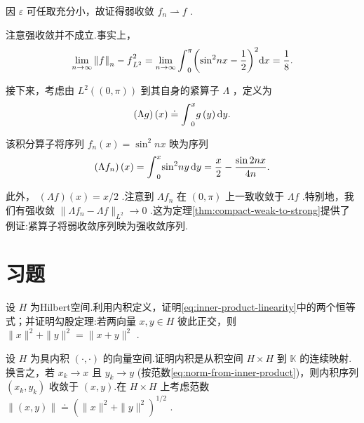 \begin{instance}
因 $\varepsilon$ 可任取充分小，故证得弱收敛 ${f}_{n} \rightharpoonup  f$ .

注意强收敛并不成立.事实上，
\[
\mathop{\lim }\limits_{{n \rightarrow  \infty }}{\norm{f}_{n} - f}_{{L}^{2}}^{2} = \mathop{\lim }\limits_{{n \rightarrow  \infty }}{\int }_{0}^{\pi }{\left( {\sin }^{2}nx - \frac{1}{2}\right) }^{2}{\mathop{}\!\mathrm{d} x} = \frac{1}{8}.
\]

接下来，考虑由 ${L}^{2}\left( \left(  {0,\pi }\right)  \right)$ 到其自身的紧算子 $\Lambda$ ，定义为
\[
\left( {\Lambda g}\right) \left( x\right)  \doteq  {\int }_{0}^{x}g\left( y\right) {\mathop{}\!\mathrm{d} y}.
\]

该积分算子将序列 ${f}_{n}\left( x\right)  = {\sin }^{2}{nx}$ 映为序列
\[
\left( {\Lambda {f}_{n}}\right) \left( x\right)  = {\int }_{0}^{x}{\sin }^{2}{ny\mathop{}\!\mathrm{d} y} = \frac{x}{2} - \frac{\sin {2nx}}{4n}.
\]

此外， $\left( {\Lambda f}\right) \left( x\right)  = x/2$ .注意到 $\Lambda {f}_{n}$ 在 $\left(  {0,\pi }\right)$ 上一致收敛于 ${\Lambda f}$ .特别地，我们有强收敛 $\| \Lambda {f}_{n} - {\Lambda f}{\| }_{{L}^{2}} \rightarrow  0$ .这为定理\ref{thm:compact-weak-to-strong}提供了例证:紧算子将弱收敛序列映为强收敛序列.
\end{instance}

\section{习题}

\begin{rbhw}[index=1]
设 $H$ 为Hilbert空间.利用内积定义，证明\eqref{eq:inner-product-linearity}中的两个恒等式；并证明勾股定理:若两向量 $x,y \in  H$ 彼此正交，则 $\| x{\| }^{2} + \| y{\| }^{2} = \| x + y{\| }^{2}$ .
\end{rbhw}

\begin{rbhw}
设 $H$ 为具内积 $\left( {\cdot , \cdot  }\right)$ 的向量空间.证明内积是从积空间 $H \times  H$ 到 $\mathbb{K}$ 的连续映射.换言之，若 ${x}_{k} \rightarrow  x$ 且 ${y}_{k} \rightarrow  y$ (按范数\eqref{eq:norm-from-inner-product})，则内积序列 $\left( {{x}_{k},{y}_{k}}\right)$ 收敛于 $\left( {x,y}\right)$.在 $H \times  H$ 上考虑范数 $\| \left( {x,y}\right) \|  \doteq  {\left( \| x{\| }^{2} + \| y{\| }^{2}\right) }^{1/2}$ .
\end{rbhw}

